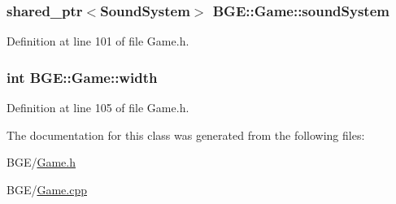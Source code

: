 \hypertarget{class_b_g_e_1_1_game_a4b56583497df19ed415237cc457cb622}{
\subsubsection[{sound\-System}]{\setlength{\rightskip}{0pt plus 5cm}shared\-\_\-ptr$<${\bf Sound\-System}$>$ B\-G\-E\-::\-Game\-::sound\-System}}\label{class_b_g_e_1_1_game_a4b56583497df19ed415237cc457cb622}


Definition at line 101 of file Game.\-h.

\hypertarget{class_b_g_e_1_1_game_a273be7b9be0947918bb9e8423aa03bfc}{
\subsubsection[{width}]{\setlength{\rightskip}{0pt plus 5cm}int B\-G\-E\-::\-Game\-::width}}\label{class_b_g_e_1_1_game_a273be7b9be0947918bb9e8423aa03bfc}


Definition at line 105 of file Game.\-h.



The documentation for this class was generated from the following files\-:\begin{DoxyCompactItemize}
\item 
B\-G\-E/\hyperlink{_game_8h}{Game.\-h}\item 
B\-G\-E/\hyperlink{_game_8cpp}{Game.\-cpp}\end{DoxyCompactItemize}
